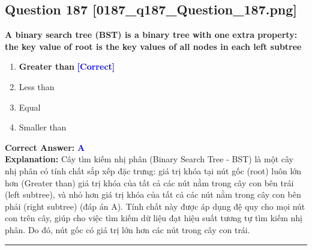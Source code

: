 \documentclass[11pt,a4paper]{article}
\begin{document}
\begin{minipage}{\textwidth}
\subsection*{Question 187 \quad \footnotesize{[0187\_q187\_Question\_187.png]}}
\noindent \textbf{A binary search tree (BST) is a binary tree with one extra property: the key value of root is the key values of all nodes in each left subtree}

\begin{enumerate}[label=\Alph*.]
    \item \textbf{Greater than} \hfill \textcolor{blue}{\textbf{[Correct]}}
    \item Less than
    \item Equal
    \item Smaller than
\end{enumerate}

\noindent \textbf{Correct Answer:} \textcolor{blue}{\textbf{A}} \\[2pt]
\noindent \textbf{Explanation:} Cây tìm kiếm nhị phân (Binary Search Tree - BST) là một cây nhị phân có tính chất sắp xếp đặc trưng: giá trị khóa tại nút gốc (root) luôn lớn hơn (Greater than) giá trị khóa của tất cả các nút nằm trong cây con bên trái (left subtree), và nhỏ hơn giá trị khóa của tất cả các nút nằm trong cây con bên phải (right subtree) (đáp án A). Tính chất này được áp dụng đệ quy cho mọi nút con trên cây, giúp cho việc tìm kiếm dữ liệu đạt hiệu suất tương tự tìm kiếm nhị phân. Do đó, nút gốc có giá trị lớn hơn các nút trong cây con trái.

\par\vspace{0.3cm}
\hrule
\vspace{0.3cm}
\end{minipage}
\end{document}
